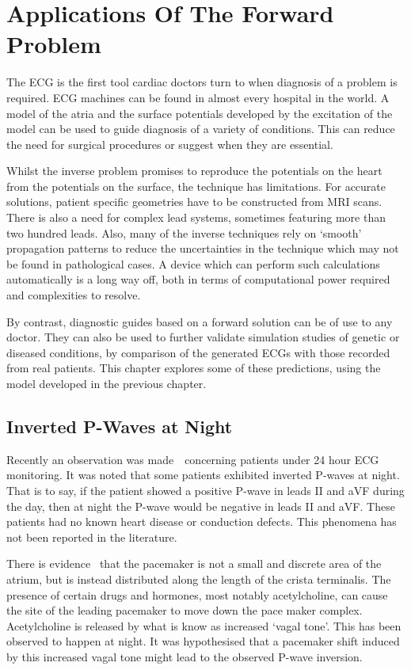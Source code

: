 \chapter{Applications Of The Forward Problem}

The ECG is the first tool cardiac doctors turn to when diagnosis of a problem is
required.
ECG machines can be found in almost every hospital in the world.
A model of the atria and the surface potentials developed by the excitation of
the model can be used to guide diagnosis of a variety of conditions.
This can reduce the need for surgical procedures or suggest when they are
essential.

Whilst the inverse problem promises to reproduce the potentials on the heart
from the potentials on the surface, the technique has limitations.
For accurate solutions, patient specific geometries have to be constructed from
MRI scans.
There is also a need for complex lead systems, sometimes featuring more than two
hundred leads.
Also, many of the inverse techniques rely on `smooth' propagation patterns to
reduce the uncertainties in the technique which may not be found in pathological
cases.
A device which can perform such calculations automatically is a long way off,
both in terms of computational power required and complexities to resolve.

By contrast, diagnostic guides based on a forward solution can be of use to any
doctor.
They can also be used to further validate simulation studies of genetic or
diseased conditions, by comparison of the generated ECGs with those recorded
from real patients.
This chapter explores some of these predictions, using the model developed in
the previous chapter.

\section{Inverted P-Waves at Night}

Recently an observation was made~\cite{BoyettPrivate}\ concerning patients under
24 hour ECG monitoring.
It was noted that some patients exhibited inverted P-waves at night.
That is to say, if the patient showed a positive P-wave in leads II and aVF
during the day, then at night the P-wave would be negative in leads II and aVF.
These patients had no known heart disease or conduction defects.
This phenomena has not been reported in the literature.

There is evidence~\cite{Shibata2001,Boineau1988,Dobrzynski2005} that the pacemaker is not a
small and discrete area of the atrium, but is instead distributed along the
length of the crista terminalis.
The presence of certain drugs and hormones, most notably acetylcholine, can cause
the site of the leading pacemaker to move down the pace maker complex.
Acetylcholine is released by what is know as increased `vagal tone'.
This has been observed to happen at night.
It was hypothesised that a pacemaker shift induced by this increased vagal tone
might lead to the observed P-wave inversion.

